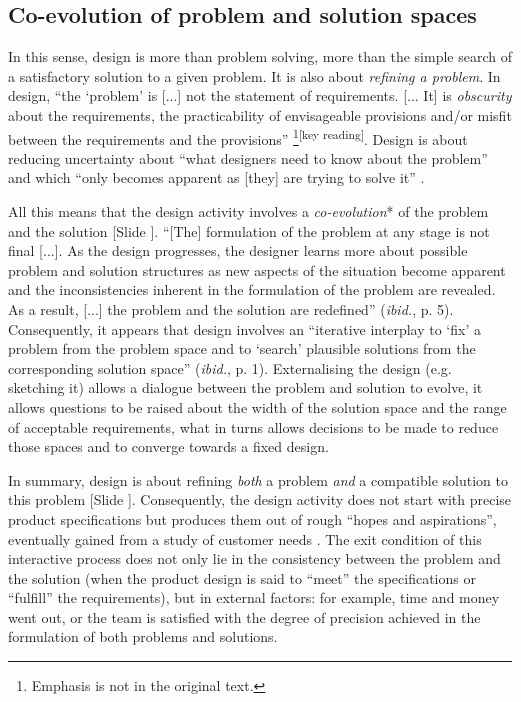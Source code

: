 \documentclass{article}
\newcounter{slide}
\begin{document}
\subsection{Co-evolution of problem and solution spaces}
\label{sec:coevolution}
In this sense, design is more than problem solving, more than the simple search of a satisfactory solution to a given problem. It is also about \emph{refining a problem}. In design, ``the `problem' is [...] not the statement of requirements. [... It] is \emph{obscurity} about the requirements, the practicability of envisageable provisions and/or misfit between the requirements and the provisions'' \cite{archerDesignDiscipline1979}\footnote{Emphasis is not in the original text.}\textsuperscript{\color{Magenta}[key reading]}. Design is about reducing uncertainty about ``what designers need to know about the problem'' and which ``only becomes apparent as [they] are trying to solve it'' \cite{crossDesignThinkingUnderstanding2011a}. 

All this means that the design activity involves a \emph{co-evolution}* of the problem and the solution {\color{blue}[Slide ]}\cite{maherFormalisingDesignExploration1996}. ``[The] formulation of the problem at any stage is not final [...]. As the design progresses, the designer learns more about possible problem and solution structures as new aspects of the situation become apparent and the inconsistencies inherent in the formulation of the problem are revealed. As a result, [...] the problem and the solution are redefined'' (\emph{ibid.}, p. 5). Consequently, it appears that design involves an ``iterative interplay to `fix' a problem from the problem space and to `search' plausible solutions from the corresponding solution space'' (\emph{ibid.}, p. 1). Externalising the design (e.g. sketching it) allows a dialogue between the problem and solution to evolve, it allows questions to be raised about the width of the solution space and the range of acceptable requirements, what in turns allows decisions to be made to reduce those spaces and to converge towards a fixed design. 

In summary, design is about refining \emph{both} a problem \emph{and} a compatible solution to this problem {\color{blue}[Slide ]}. Consequently, the design activity does not start with precise product specifications but produces them out of rough ``hopes and aspirations'', eventually gained from a study of customer needs \cite[p. 73]{ulrichProductDesignDevelopment2011}. The exit condition of this interactive process does not only lie in the consistency between the problem and the solution (when the product design is said to ``meet'' the specifications or ``fulfill'' the requirements), but in external factors: for example, time and money went out, or the team is satisfied with the degree of precision achieved in the formulation of both problems and solutions. 
\end{document}
